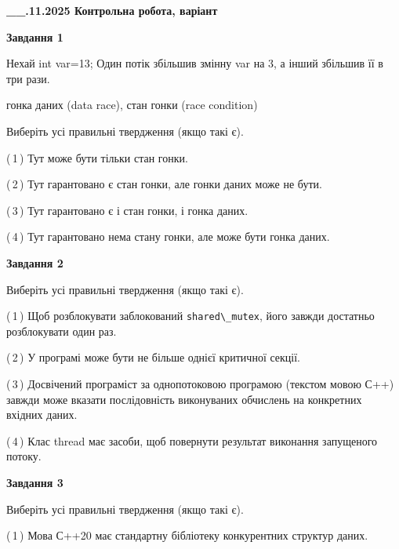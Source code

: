 \documentclass[12pt, ukrainian]{article}
\def\code#1{\Verb!#1!}
\begin{document}
\begin {large}

\textbf{\_\_.11.2025 Контрольна робота, варіант  }\par


{

\begin{center}
\textbf{Завдання 1}
\end{center}
Нехай int var=13; Один потік збільшив змінну var на 3, а інший збільшив її в три рази.

гонка даних (data race), стан гонки (race condition)

Виберіть усі правильні твердження (якщо такі є).\par
\vspace{2mm}
(\,1\,) Тут може бути тільки стан гонки.%

(\,2\,) Тут гарантовано є стан гонки, але гонки даних може не бути.%

(\,3\,) Тут гарантовано є і стан гонки, і гонка даних.%

(\,4\,) Тут гарантовано нема стану гонки, але може бути гонка даних.%



\begin{center}
\textbf{Завдання 2}
\end{center}
Виберіть усі правильні твердження (якщо такі є).\par
\vspace{2mm}

(\,1\,) Щоб розблокувати заблокований \code{shared\_mutex}, його завжди достатньо розблокувати один раз.%

(\,2\,) У програмі може бути не більше однієї критичної секції.%

(\,3\,) Досвічений програміст за однопотоковою програмою (текстом мовою С++) завжди може вказати послідовність виконуваних обчислень на конкретних вхідних даних.%

(\,4\,) Клас thread має засоби, щоб повернути результат виконання запущеного потоку.%



\begin{center}
\textbf{Завдання 3}
\end{center}
Виберіть усі правильні твердження (якщо такі є).\par
\vspace{2mm}

(\,1\,) Мова С++20 має стандартну бібліотеку конкурентних структур даних.%

}
\end{large}
\end{document}

